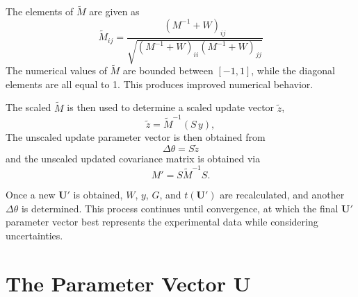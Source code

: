 The elements of $\widetilde{M}$ are given as
\begin{equation}
\widetilde{M}_{ij} = \frac{(M^{-1} + W)_{ij}}{\sqrt{(M^{-1} + W)_{ii}(M^{-1} + W)_{jj}}}
\end{equation}
The numerical values of $\widetilde{M}$ are bounded between $[-1,1]$, while the diagonal elements are all equal to 1. This produces improved numerical behavior.

The scaled $\widetilde{M}$ is then used to determine a scaled update vector $\widetilde{z}$,
\begin{equation}
    \widetilde{z} = \widetilde{M}^{-1} (S\,y),
\end{equation}
The unscaled update parameter vector is then obtained from
\begin{equation}
    \Delta \theta = S \widetilde{z}
\end{equation}
and the unscaled updated covariance matrix is obtained via
\begin{equation}
    M' = S \widetilde{M}^{-1} S.
\end{equation}

Once a new $\mathbf{U}'$ is obtained, $W$, $y$, $G$, and $t(\mathbf{U}')$ are recalculated, and another $\Delta \theta$ is determined. This process continues until convergence, at which the final $\mathbf{U}'$ parameter vector best represents the experimental data while considering uncertainties.

\section{The Parameter Vector $\mathbf{U}$}
